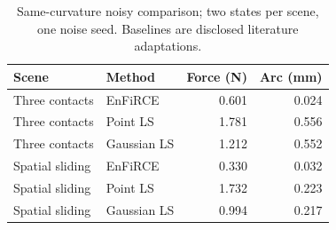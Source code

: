 \begin{table}[t]
\caption{Same-curvature noisy comparison; two states per scene, one noise seed. Baselines are disclosed literature adaptations.}
\label{tab:baseline}
\centering\small
\begin{tabular}{llrr}
\toprule
Scene & Method & Force (N) & Arc (mm)\\
\midrule
Three contacts & EnFiRCE & 0.601 & 0.024\\
Three contacts & Point LS & 1.781 & 0.556\\
Three contacts & Gaussian LS & 1.212 & 0.552\\
Spatial sliding & EnFiRCE & 0.330 & 0.032\\
Spatial sliding & Point LS & 1.732 & 0.223\\
Spatial sliding & Gaussian LS & 0.994 & 0.217\\
\bottomrule
\end{tabular}
\end{table}
